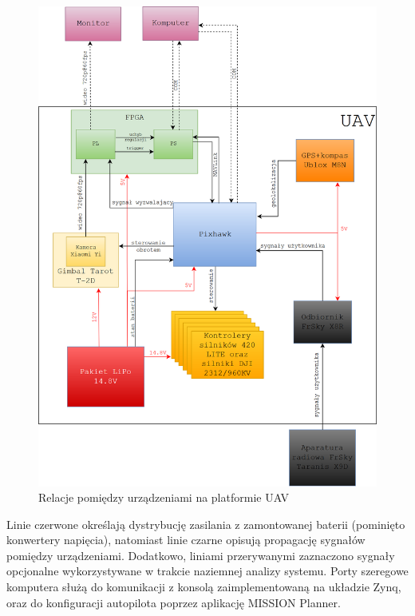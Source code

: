 \begin{figure}[]
	\centering
	\includegraphics[width=15cm]{5_drone_architecture.png}
	\caption{Relacje pomiędzy urządzeniami na platformie UAV}
	\label{fig:architecture}
\end{figure}
Linie czerwone określają dystrybucję zasilania z zamontowanej baterii (pominięto konwertery napięcia), natomiast linie czarne opisują propagację sygnałów pomiędzy urządzeniami. Dodatkowo, liniami przerywanymi zaznaczono sygnały opcjonalne wykorzystywane w trakcie naziemnej analizy systemu. Porty szeregowe komputera służą do komunikacji z konsolą zaimplementowaną na układzie Zynq, oraz do konfiguracji autopilota poprzez aplikację MISSION Planner.




